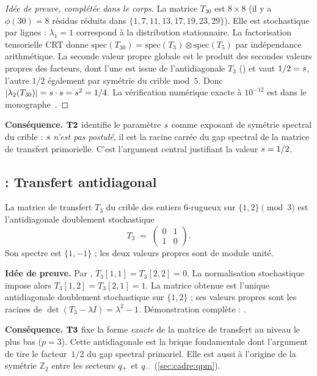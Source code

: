 \begin{proof}[Idée de preuve, complétée dans le corps]
La matrice $T_{30}$ est $8 \times 8$ (il y a $\phi(30) = 8$ résidus réduits dans $\{1,7,11,13,17,19,23,29\}$). Elle est stochastique par lignes : $\lambda_1 = 1$ correspond à la distribution stationnaire. La factorisation tensorielle CRT donne $\mathrm{spec}(T_{30}) = \mathrm{spec}(T_3) \otimes \mathrm{spec}(T_5)$ par indépendance arithmétique. La seconde valeur propre globale est le produit des secondes valeurs propres des facteurs, dont l'une est issue de l'antidiagonale $T_3$ (\Tthree) et vaut $1/2 = s$, l'autre $1/2$ également par symétrie du crible mod~$5$. Donc $|\lambda_2(T_{30})| = s \cdot s = s^2 = 1/4$. La vérification numérique exacte à $10^{-12}$ est dans le monographe~\cite[ch.~03]{PT_Monograph}.
\end{proof}

\textbf{Conséquence.} $\textbf{T2}$ identifie le paramètre $s$ comme exposant de symétrie spectral du crible : $s$ \emph{n'est pas postulé}, il est la racine carrée du gap spectral de la matrice de transfert primorielle. C'est l'argument central justifiant la valeur $s = 1/2$.

\subsection{\Tthree{} : Transfert antidiagonal}
\label{sec:theoremes:T3}

\begin{theoreme}
\label{thm:T3}
La matrice de transfert $T_3$ du crible des entiers $6$-rugueux sur $\{1, 2\} \pmod 3$ est l'antidiagonale doublement stochastique
\[
T_3 \;=\; \begin{pmatrix} 0 & 1 \\ 1 & 0 \end{pmatrix}.
\]
Son spectre est $\{1, -1\}$ ; les deux valeurs propres sont de module unité.
\end{theoreme}

\textbf{Idée de preuve.} Par \Tone, $T_3[1,1] = T_3[2,2] = 0$. La normalisation stochastique impose alors $T_3[1,2] = T_3[2,1] = 1$. La matrice obtenue est l'unique antidiagonale doublement stochastique sur $\{1,2\}$ ; ses valeurs propres sont les racines de $\det(T_3 - \lambda I) = \lambda^2 - 1$. Démonstration complète : \cite[ch.~01]{PT_Monograph}.

\textbf{Conséquence.} $\textbf{T3}$ fixe la forme \emph{exacte} de la matrice de transfert au niveau le plus bas ($p=3$). Cette antidiagonale est la brique fondamentale dont l'argument de \Ttwo{} tire le facteur~$1/2$ du gap spectral primoriel. Elle est aussi à l'origine de la symétrie $\mathbb{Z}_2$ entre les secteurs $q_{+}$ et $q_{-}$ (\ref{sec:cadre:qpm}).

